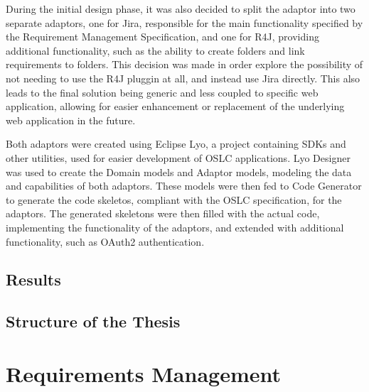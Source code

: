 During the initial design phase, it was also decided to split the adaptor into two separate adaptors, one for Jira, responsible for the main functionality specified by the Requirement Management Specification, and one for R4J, providing additional functionality, such as the ability to create folders and link requirements to folders. This decision was made in order explore the possibility of not needing to use the R4J pluggin at all, and instead use Jira directly. This also leads to the final solution being generic and less coupled to specific web application, allowing for easier enhancement or replacement of the underlying web application in the future.

Both adaptors were created using Eclipse Lyo, a project containing SDKs and other utilities, used for easier development of OSLC applications. Lyo Designer was used to create the Domain models and Adaptor models, modeling the data and capabilities of both adaptors. These models were then fed to Code Generator to generate the code skeletos, compliant with the OSLC specification, for the adaptors. The generated skeletons were then filled with the actual code, implementing the functionality of the adaptors, and extended with additional functionality, such as OAuth2 authentication.

\section{Results}

\section{Structure of the Thesis}


\chapter{Requirements Management}


